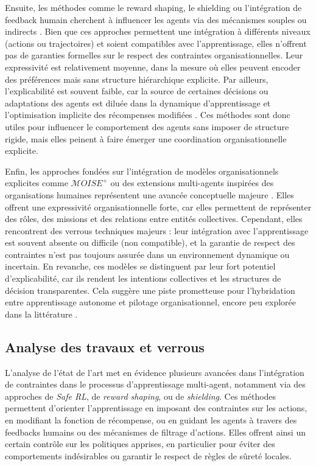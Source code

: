 Ensuite, les méthodes comme le reward shaping, le shielding ou l’intégration de feedback humain cherchent à influencer les agents via des mécanismes souples ou indirects \cite{ng1999policy}. Bien que ces approches permettent une intégration à différents niveaux (actions ou trajectoires) et soient compatibles avec l’apprentissage, elles n’offrent pas de garanties formelles sur le respect des contraintes organisationnelles. Leur expressivité est relativement moyenne, dans la mesure où elles peuvent encoder des préférences mais sans structure hiérarchique explicite. Par ailleurs, l’explicabilité est souvent faible, car la source de certaines décisions ou adaptations des agents est diluée dans la dynamique d’apprentissage et l’optimisation implicite des récompenses modifiées \cite{warnell2018deep, amodei2016concrete}. Ces méthodes sont donc utiles pour influencer le comportement des agents sans imposer de structure rigide, mais elles peinent à faire émerger une coordination organisationnelle explicite.

Enfin, les approches fondées sur l’intégration de modèles organisationnels explicites comme $\mathcal{M}OISE^+$ ou des extensions multi-agents inspirées des organisations humaines représentent une avancée conceptuelle majeure \cite{hubner2007using}. Elles offrent une expressivité organisationnelle forte, car elles permettent de représenter des rôles, des missions et des relations entre entités collectives. Cependant, elles rencontrent des verrous techniques majeurs : leur intégration avec l’apprentissage est souvent absente ou difficile (non compatible), et la garantie de respect des contraintes n’est pas toujours assurée dans un environnement dynamique ou incertain. En revanche, ces modèles se distinguent par leur fort potentiel d’explicabilité, car ils rendent les intentions collectives et les structures de décision transparentes. Cela suggère une piste prometteuse pour l’hybridation entre apprentissage autonome et pilotage organisationnel, encore peu explorée dans la littérature \cite{bordini2006jade, chernova2014robot}.

\subsection*{Analyse des travaux et verrous}

L’analyse de l’état de l’art met en évidence plusieurs avancées dans l’intégration de contraintes dans le processus d’apprentissage multi-agent, notamment via des approches de \textit{Safe RL}, de \textit{reward shaping}, ou de \textit{shielding}. Ces méthodes permettent d’orienter l’apprentissage en imposant des contraintes sur les actions, en modifiant la fonction de récompense, ou en guidant les agents à travers des feedbacks humains ou des mécanismes de filtrage d’actions. Elles offrent ainsi un certain contrôle sur les politiques apprises, en particulier pour éviter des comportements indésirables ou garantir le respect de règles de sûreté locales.

